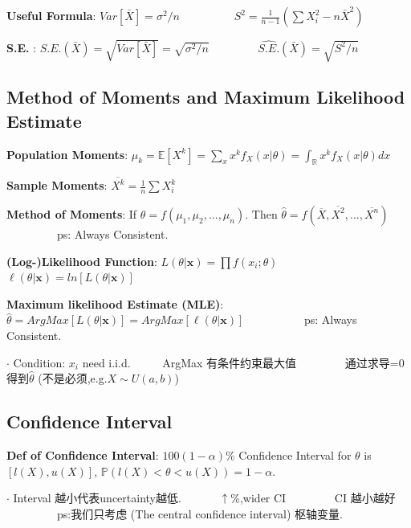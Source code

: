\documentclass[9pt]{article}
\begin{document}
\textbf{Useful Formula}: $Var[\bar{X}]=\sigma^2/n$ \ \ \ \ \ \ \ \ \ $S^2=\frac{1}{n-1}(\sum X^2_i -n\bar{X}^2)$

\textbf{S.E. }: $S.E.(\bar{X})=\sqrt{Var[\bar{X}]}=\sqrt{\sigma^2/n}$ \ \ \ \ \ \ \ \ $\widehat{S.E.}(\bar{X})=\sqrt{S^2/n}$

\subsection{Method of Moments and Maximum Likelihood Estimate}

\textbf{Population Moments}: $\mu_k=\mathbb{E}[X^k]=\sum_x x^kf_X(x|\theta)=\int_{\mathbb{R}}x^kf_X(x|\theta)dx$

\textbf{Sample Moments}: $\overline{X^k}=\frac{1}{n}\sum X^k_i$

\textbf{Method of Moments}: If $\theta=f(\mu_1,\mu_2,...,\mu_n)$. Then $\hat{\theta}=f(\overline{X},\overline{X^2},...,\overline{X^n})$ \ \ \ \ \ \ \ \ \ ps: Always Consistent.

\textbf{(Log-)Likelihood Function}: $L(\theta|\mathbf{x})=\prod f(x_i;\theta)$ \ \ \ \ $\ell(\theta|\mathbf{x})=ln[L(\theta|\mathbf{x})]$

\textbf{Maximum likelihood Estimate (MLE)}: $\hat{\theta}=ArgMax[L(\theta|\mathbf{x})]=ArgMax[\ell(\theta|\mathbf{x})]$ \ \ \ \ \ \ \ \ \ \ ps: Always Consistent.

$\cdot$ Condition: $x_i$ need i.i.d. \ \ \ \ \ ArgMax 有条件约束最大值 \ \ \ \ \ \ \ \ 通过求导=0得到$\hat{\theta}$ (不是必须,e.g.$X\sim U(a,b)$)

\subsection{Confidence Interval}

\textbf{Def of Confidence Interval}: $100(1-\alpha)\%$ Confidence Interval for $\theta$ is $[l(X),u(X)]$, $\mathbb{P}(l(X)<\theta<u(X))=1-\alpha.$

$\cdot$ Interval 越小代表uncertainty越低. \ \ \ \ \ \ $\uparrow\%$,wider CI \ \ \ \ \ \ \ \ CI 越小越好 \ \ \ \ \ \ \ \ \  {\footnotesize ps:我们只考虑 (The central confidence interval) 枢轴变量.}
\end{document}
